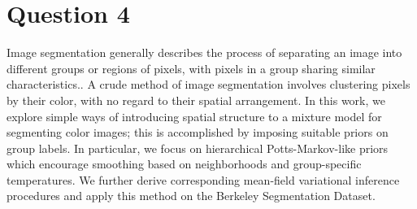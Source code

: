 \documentclass[12pt]{article}
\begin{document}
\clearpage

\section*{Question 4}


Image segmentation generally describes the process of separating an image into
different groups or regions of pixels, with pixels in a group sharing
similar characteristics..
A crude method of image segmentation involves clustering pixels by their color,
with no regard to their spatial arrangement.
In this work, we explore simple ways of introducing spatial structure to a mixture
model for segmenting color images; this is accomplished by imposing suitable
priors on group labels.
In particular, we focus on hierarchical Potts-Markov-like priors which
encourage smoothing based on neighborhoods and group-specific temperatures.
We further derive corresponding mean-field variational inference procedures and
apply this method on the Berkeley Segmentation Dataset.
\end{document}
